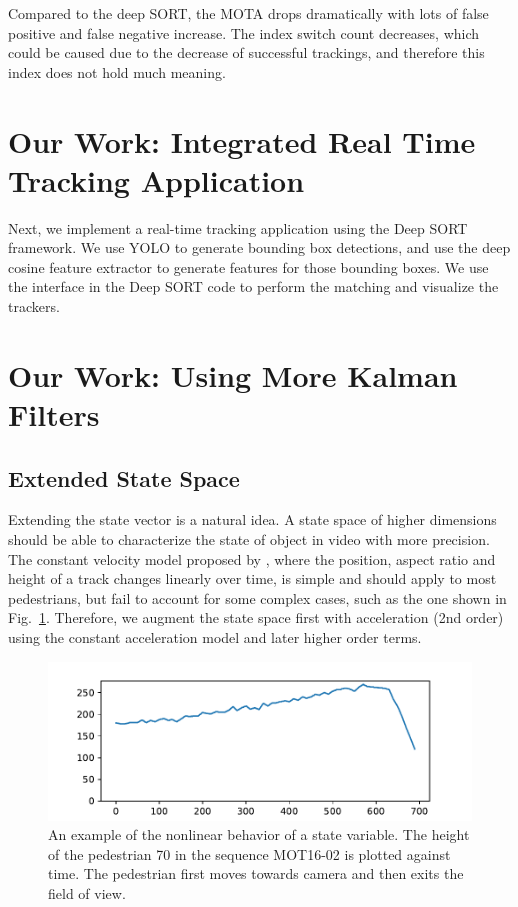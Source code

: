 \documentclass[conference]{IEEEtran}
\begin{document}
Compared to the deep SORT, the MOTA drops dramatically with lots of false positive and false negative increase.
The index switch count decreases, which could be caused due to the decrease of successful trackings, and therefore this index does not hold much meaning.


\section{Our Work: Integrated Real Time Tracking Application}
Next, we implement a real-time tracking application using the Deep SORT framework.
We use YOLO to generate bounding box detections, and use the deep cosine feature extractor to generate features for those bounding boxes.
We use the interface in the Deep SORT code to perform the matching and visualize the trackers.

\section{Our Work: Using More Kalman Filters}
\label{sec:our-work}
\subsection{Extended State Space}

Extending the state vector is a natural idea. A state space of higher dimensions should be able to characterize the state of object in video with more precision. The constant velocity model proposed by \cite{Wojke2017simple}, where the position, aspect ratio and height of a track changes linearly over time, is simple and should apply to most pedestrians, but fail to account for some complex cases, such as the one shown in Fig.~\ref{fig:example-of-nonlinearity}. Therefore, we augment the state space first with acceleration (2nd order) using the constant acceleration model and later higher order terms.

\begin{figure}[h]
    \centering
    \includegraphics[width=\linewidth]{fig/accelerating-pedestrian-height-plot.pdf}
    \caption{An example of the nonlinear behavior of a state variable. The height of the pedestrian 70 in the sequence MOT16-02 is plotted against time. The pedestrian first moves towards camera and then exits the field of view.}
    \label{fig:example-of-nonlinearity}
\end{figure}
\end{document}
